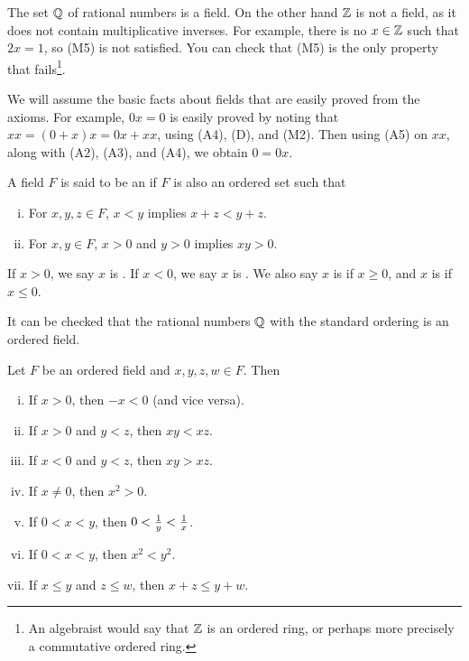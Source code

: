 \begin{example}
The set $\Q$ of rational numbers is a field.  On the other hand $\Z$ is not a
field, as it does not contain multiplicative inverses.  For example,
there is no $x \in \Z$ such that $2x = 1$, so (M5) is not satisfied.  You
can check that (M5) is the only property that fails\footnote{An algebraist would say that $\Z$ is an ordered
ring, or perhaps more precisely a commutative ordered ring.}.
\end{example}

We will assume the basic facts about fields that are easily 
proved from the axioms.  For example, $0x = 0$ is easily proved
by noting that $xx = (0+x)x = 0x+xx$, using (A4), (D)\@, and (M2).  Then
using (A5) on $xx$, along with (A2), (A3), and (A4), we obtain $0 = 0x$.

\begin{defn}
A field $F$ is said to be an \emph{} if
$F$ is also an ordered set such that
\begin{enumerate}[(i)]
\item \label{defn:ordfield:i} For $x,y,z \in F$,  $x < y$ implies $x+z <
y+z$.
\item \label{defn:ordfield:ii} For $x,y \in F$, $x > 0$ and $y > 0$
implies $xy > 0$.
\end{enumerate}
If $x > 0$, we say $x$ is \emph{}.
If $x < 0$, we say $x$ is \emph{}.
We also say $x$ is \emph{} if $x \geq 0$,
and $x$ is \emph{} if $x \leq 0$.
\end{defn}

It can be checked that the rational numbers $\Q$ with the
standard ordering is an ordered field.

\begin{prop} \label{prop:bordfield}
Let $F$ be an ordered field and $x,y,z,w \in F$.  Then
\begin{enumerate}[(i)]
\item \label{prop:bordfield:i} If $x > 0$, then $-x < 0$ (and vice versa).
\item \label{prop:bordfield:ii} If $x > 0$ and $y < z$, then $xy < xz$.
\item \label{prop:bordfield:iii} If $x < 0$ and $y < z$, then $xy > xz$.
\item \label{prop:bordfield:iv} If $x \not= 0$, then $x^2 > 0$.
\item \label{prop:bordfield:v} If $0 < x < y$, then $0 < \nicefrac{1}{y} < \nicefrac{1}{x}$.
\item \label{prop:bordfield:vi} If $0 < x < y$, then $x^2 < y^2$.
\item \label{prop:bordfield:vii} If $x \leq y$ and $z \leq w$, then $x + z \leq y + w$.
\end{enumerate}
\end{prop}

